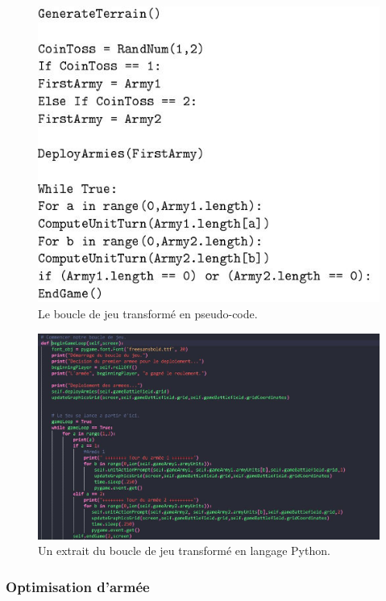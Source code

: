 \documentclass[a4paper, 11pt]{article}
\begin{document}
\begin{figure}[!htbp]

\includegraphics[scale=0.5]{PseudoCode-Boucle}

\caption{Le boucle de jeu transformé en pseudo-code.}

\end{figure}

\begin{figure}[!htbp]

\includegraphics[scale=0.4]{Python-Boucle}

\caption{Un extrait du boucle de jeu transformé en langage Python.}

\end{figure}

\subsubsection{Optimisation d'armée}
\end{document}
